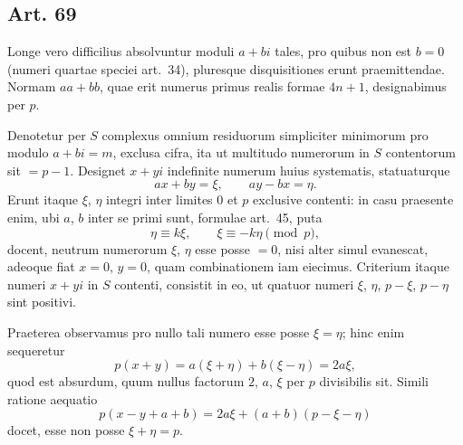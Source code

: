 \documentclass[12pt]{article}
\newcommand{\art}[1]{\subsection*{Art. #1}}
\begin{document}
\art{69}
Longe vero difficilius absolvuntur moduli $a+bi$ tales, pro quibus non est $b=0$ (numeri quartae speciei art.~34), pluresque disquisitiones erunt praemittendae. Normam $aa+bb$, quae erit numerus primus realis formae $4n+1$, designabimus per $p$.

Denotetur per $S$ complexus omnium residuorum simpliciter minimorum pro modulo $a+bi=m$, exclusa cifra, ita ut multitudo numerorum in $S$ contentorum sit $=p-1$. Designet $x+yi$ indefinite numerum huius systematis, statuaturque
\[
ax+by=\xi,\qquad ay-bx=\eta.
\]
Erunt itaque $\xi$, $\eta$ integri inter limites $0$ et $p$ exclusive contenti: in casu praesente enim, ubi $a$, $b$ inter se primi sunt, formulae art.~45, puta
\[
\eta\equiv k\xi,\qquad \xi\equiv-k\eta\pmod p,
\]
docent, neutrum numerorum $\xi$, $\eta$ esse posse $=0$, nisi alter simul evanescat, adeoque fiat $x=0$, $y=0$, quam combinationem iam eiecimus. Criterium itaque numeri $x+yi$ in $S$ contenti, consistit in eo, ut quatuor numeri $\xi$, $\eta$, $p-\xi$, $p-\eta$ sint positivi.

Praeterea observamus pro nullo tali numero esse posse $\xi=\eta$; hinc enim sequeretur
\[
p(x+y)=a(\xi+\eta)+b(\xi-\eta)=2a\xi,
\]
quod est absurdum, quum nullus factorum $2$, $a$, $\xi$ per $p$ divisibilis sit. Simili ratione aequatio
\[
p(x-y+a+b)=2a\xi+(a+b)(p-\xi-\eta)
\]
docet, esse non posse $\xi+\eta=p$.
\end{document}
